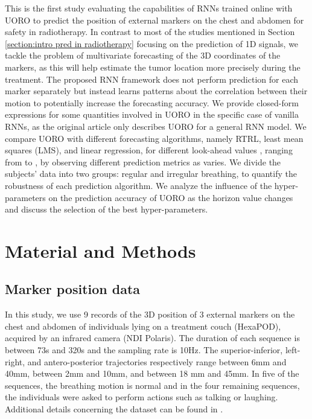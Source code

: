 \documentclass[twocolumn,a4paper]{svjour3} \sloppy          \smartqed
\begin{document}
This is the first study evaluating the capabilities of RNNs trained online with UORO to predict the position of external markers on the chest and abdomen for safety in radiotherapy. In contrast to most of the studies mentioned in Section \ref{section:intro pred in radiotherapy} focusing on the prediction of 1D signals, we tackle the problem of multivariate forecasting of the 3D coordinates of the markers, as this will help estimate the tumor location more precisely during the treatment. The proposed RNN framework does not perform prediction for each marker separately but instead learns patterns about the correlation between their motion to potentially increase the forecasting accuracy. We provide closed-form expressions for some quantities involved in UORO in the specific case of vanilla RNNs, as the original article \citep{tallec2017unbiased} only describes UORO for a general RNN model. We compare UORO with different forecasting algorithms, namely RTRL, least mean squares (LMS), and linear regression, for different look-ahead values , ranging from  to , by observing different prediction metrics as  varies. We divide the subjects' data into two groups: regular and irregular breathing, to quantify the robustness of each prediction algorithm. We analyze the influence of the hyper-parameters on the prediction accuracy of UORO as the horizon value changes and discuss the selection of the best hyper-parameters. 


\section{Material and Methods}

\subsection{Marker position data}

In this study, we use 9 records of the 3D position of 3 external markers on the chest and abdomen of individuals lying on a treatment couch (HexaPOD), acquired by an infrared camera (NDI Polaris). The duration of each sequence is between 73s and 320s and the sampling rate is 10Hz. The superior-inferior, left-right, and antero-posterior trajectories respectively range between 6mm and 40mm, between 2mm and 10mm, and between 18 mm and 45mm. In five of the sequences, the breathing motion is normal and in the four remaining sequences, the individuals were asked to perform actions such as talking or laughing. Additional details concerning the dataset can be found in \cite{krilavicius2016predicting}.
\end{document}
